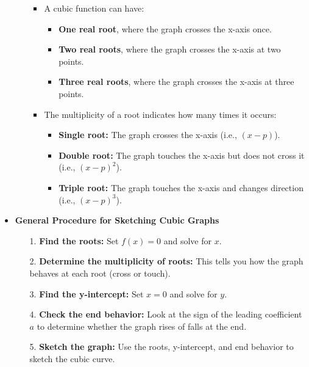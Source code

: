 \begin{itemize}
\begin{itemize}
\begin{itemize}
            \item A cubic function can have:
            \begin{itemize}
                \item \textbf{One real root}, where the graph crosses the x-axis once.
                \item \textbf{Two real roots}, where the graph crosses the x-axis at two points.
                \item \textbf{Three real roots}, where the graph crosses the x-axis at three points.
            \end{itemize}
            \item The multiplicity of a root indicates how many times it occurs:
            \begin{itemize}
                \item \textbf{Single root:} The graph crosses the x-axis (i.e., $\left(x - p\right)$).
                \item \textbf{Double root:} The graph touches the x-axis but does not cross it (i.e., $\left(x - p\right)^2$).
                \item \textbf{Triple root:} The graph touches the x-axis and changes direction (i.e., $\left(x - p\right)^3$).
            \end{itemize}
        \end{itemize}
    \end{itemize}
    \item \textbf{General Procedure for Sketching Cubic Graphs}
    \begin{itemize}
        \item[1.] \textbf{Find the roots:} Set $f(x) = 0$ and solve for $x$.
        \item[2.] \textbf{Determine the multiplicity of roots:} This tells you how the graph behaves at each root (cross or
        touch).
        \item[3.] \textbf{Find the y-intercept:} Set $x = 0$ and solve for $y$.
        \item[4.] \textbf{Check the end behavior:} Look at the sign of the leading coefficient $a$ to determine whether the graph
        rises of falls at the end.
        \item[5.] \textbf{Sketch the graph:} Use the roots, y-intercept, and end behavior to sketch the cubic curve.
    \end{itemize}
\end{itemize}